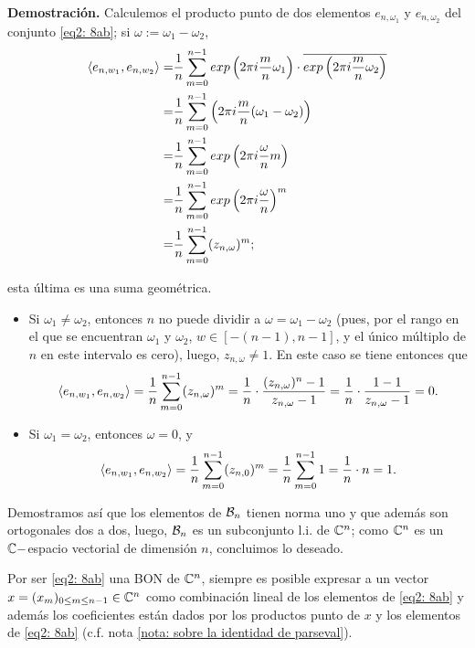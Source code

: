 \noindent
\textbf{Demostración.}
Calculemos el producto punto de dos elementos
$e_{n,\omega_{1}}$ y $e_{n,\omega_{2}}$ del conjunto \eqref{eq2: 8ab};
si $\omega := \omega_{1}-\omega_{2}$,
\begin{align*}
\langle e_{n,w_{1}}, e_{n,w_{2}} \rangle = &
\frac{1}{n}
\sum\limits_{m=0}^{n-1}exp \left( 2 \pi i \frac{m}{n} \omega_{1} \right)
\cdot \overline{ exp \left( 2 \pi i \frac{m}{n} \omega_{2} \right) } \\
= & \frac{1}{n}
\sum\limits_{m=0}^{n-1}\left( 2 \pi i \frac{m}{n} (\omega_{1}-\omega_{2}) \right) \\
= & \frac{1}{n}\sum\limits_{m=0}^{n-1}exp\left( 2 \pi i \frac{\omega}{n} m \right) \\
= & \frac{1}{n}\sum\limits_{m=0}^{n-1}exp\left( 2 \pi i \frac{\omega}{n}  \right)^{m} \\
= & \frac{1}{n}\sum\limits_{m=0}^{n-1}(z_{n, \omega})^{m};
\end{align*}

\noindent
esta última es una suma geométrica. 
\begin{itemize}
	\item Si $\omega_{1} \neq \omega_{2}$, entonces $n$ no puede dividir 
	a $\omega = \omega_{1}-\omega_{2}$ (pues, por el rango en el que se encuentran
	$\omega_{1}$ y $\omega_{2}$, $w \in [-(n-1), n-1]$, y el único múltiplo
	de $n$ en este intervalo es cero), luego, $z_{n, \omega} \neq 1$.
	En este caso se tiene entonces que 
	\[
	\langle e_{n,w_{1}}, e_{n,w_{2}} \rangle = 
	\frac{1}{n}\sum\limits_{m=0}^{n-1}(z_{n, \omega})^{m}
	= \frac{1}{n} \cdot \frac{(z_{n, \omega})^{n}-1}{z_{n, \omega}-1}=
	\frac{1}{n} \cdot \frac{1-1}{z_{n, \omega}-1}=0.
	\]
	
	\item Si $\omega_{1} = \omega_{2}$, entonces $\omega = 0$, y
	\[
	\langle e_{n,w_{1}}, e_{n,w_{2}} \rangle = 
	\frac{1}{n}\sum\limits_{m=0}^{n-1}(z_{n, 0})^{m}
	= \frac{1}{n}\sum\limits_{m=0}^{n-1}1 = \frac{1}{n} \cdot n = 1.
	\]
\end{itemize}

Demostramos así que los elementos de $\mathcal{B}_{n}$
tienen norma uno y que además
son ortogonales
dos a dos, luego, $\mathcal{B}_{n}$ es un subconjunto l.i. 
de $\mathbb{C}^{n}$; como $\mathbb{C}^{n}$ es un $\mathbb{C}-$espacio vectorial de 
dimensión $n$, concluimos lo deseado.
\QEDB
\vspace{0.2cm}

Por ser \eqref{eq2: 8ab} una BON de $\mathbb{C}^{n}$, siempre es
posible expresar a un vector $x = (x_{m})_{0 \leq m \leq n-1} \in \mathbb{C}^{n}$
como combinación lineal de los elementos de \eqref{eq2: 8ab}
y además los coeficientes están dados por los productos punto
de $x$ y los elementos de \eqref{eq2: 8ab}
(c.f. nota \ref{nota: sobre la identidad de parseval}).

